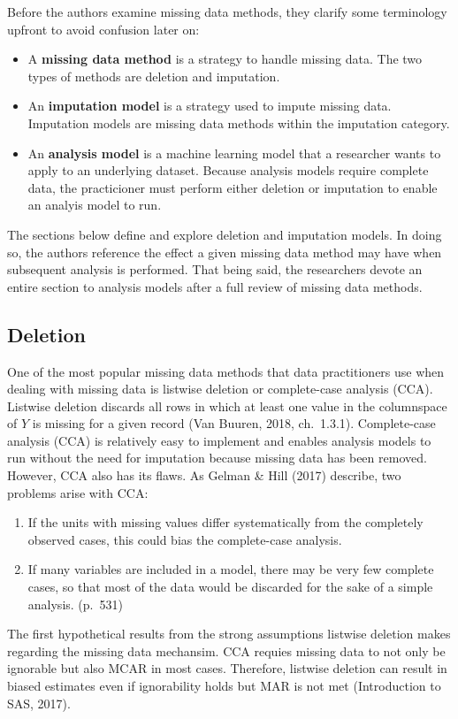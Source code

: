 \documentclass[12pt,oneside]{chicagocapstone}
\providecommand{\tightlist}{%
  \setlength{\itemsep}{0pt}\setlength{\parskip}{0pt}}
\begin{document}
Before the authors examine missing data methods, they clarify some
terminology upfront to avoid confusion later on:
\begin{itemize}
\tightlist
\item
  A \textbf{missing data method} is a strategy to handle missing data.
  The two types of methods are deletion and imputation.
\item
  An \textbf{imputation model} is a strategy used to impute missing
  data. Imputation models are missing data methods within the imputation
  category.
\item
  An \textbf{analysis model} is a machine learning model that a
  researcher wants to apply to an underlying dataset. Because analysis
  models require complete data, the practicioner must perform either
  deletion or imputation to enable an analyis model to run.
\end{itemize}
The sections below define and explore deletion and imputation models. In
doing so, the authors reference the effect a given missing data method
may have when subsequent analysis is performed. That being said, the
researchers devote an entire section to analysis models after a full
review of missing data methods.

\hypertarget{background-deletion}{\subsection*{Deletion}\label{background-deletion}}

One of the most popular missing data methods that data practitioners use
when dealing with missing data is listwise deletion or complete-case
analysis (CCA). Listwise deletion discards all rows in which at least
one value in the columnspace of \(Y\) is missing for a given record (Van
Buuren, 2018, ch.~1.3.1). Complete-case analysis (CCA) is relatively
easy to implement and enables analysis models to run without the need
for imputation because missing data has been removed. However, CCA also
has its flaws. As Gelman \& Hill (2017) describe, two problems arise
with CCA:
\begin{enumerate}
\def\labelenumi{\arabic{enumi}.}
\tightlist
\item
  If the units with missing values differ systematically from the
  completely observed cases, this could bias the complete-case analysis.
\item
  If many variables are included in a model, there may be very few
  complete cases, so that most of the data would be discarded for the
  sake of a simple analysis. (p.~531)
\end{enumerate}
The first hypothetical results from the strong assumptions listwise
deletion makes regarding the missing data mechansim. CCA requies missing
data to not only be ignorable but also MCAR in most cases. Therefore,
listwise deletion can result in biased estimates even if ignorability
holds but MAR is not met (Introduction to SAS, 2017).
\end{document}
